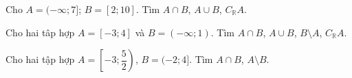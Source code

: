 \begin{bt}%
Cho $A=(-\infty ; 7]$; $B=[2; 10]$. Tìm $A \cap B$, $A \cup B$, $C_{\mathbb{R}} A$.
\loigiai{
	Ta có  $A\cap B=[2;7]$, $A\cup B=(-\infty;10]$ và $\mathrm{C}_{\mathbb{R}}A=(7; +\infty)$. 
}
\end{bt}


\begin{bt}%
	Cho hai tâp hợp $A=[-3; 4]$ và $B=(-\infty; 1)$. Tìm $A \cap B$, $A \cup B$, $B \setminus A$, $C_{\mathbb{R}} A$.
\end{bt}

\begin{bt}%
	Cho hai tập hợp $A=\left[-3;\dfrac{5}{2}\right)$, $B=(-2;4]$. Tìm $A \cap B$, $A \setminus B$.
\end{bt}

